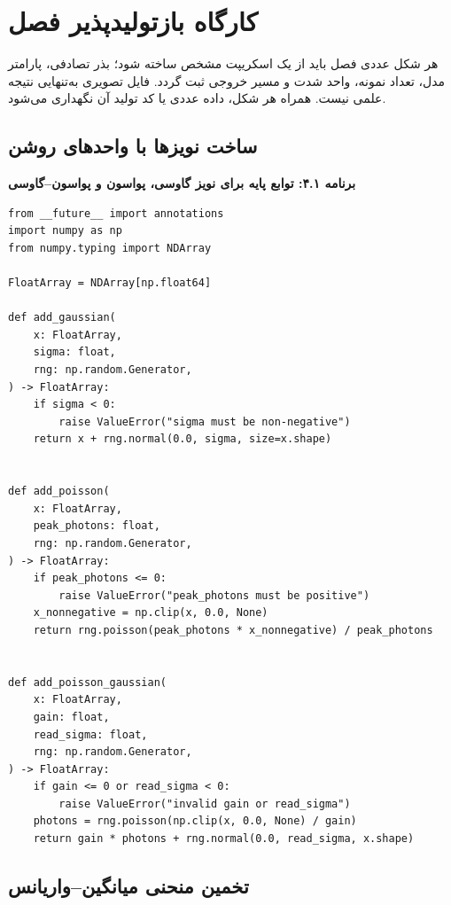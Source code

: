 \documentclass[12pt,openany,oneside]{book}
\begin{document}
\section{کارگاه بازتولیدپذیر فصل}

\begin{codecontract}
هر شکل عددی فصل باید از یک اسکریپت مشخص ساخته شود؛ بذر تصادفی، پارامتر مدل، تعداد نمونه، واحد شدت و مسیر خروجی
ثبت گردد. فایل تصویری به‌تنهایی نتیجه علمی نیست. همراه هر شکل، داده عددی یا کد تولید آن نگهداری می‌شود.
\end{codecontract}

\subsection{ساخت نویزها با واحدهای روشن}

\noindent\textbf{برنامه ۴.۱: توابع پایه برای نویز گاوسی، پواسون و پواسون--گاوسی}\par
\begin{latin}
\begin{lstlisting}
from __future__ import annotations
import numpy as np
from numpy.typing import NDArray

FloatArray = NDArray[np.float64]

def add_gaussian(
    x: FloatArray,
    sigma: float,
    rng: np.random.Generator,
) -> FloatArray:
    if sigma < 0:
        raise ValueError("sigma must be non-negative")
    return x + rng.normal(0.0, sigma, size=x.shape)


def add_poisson(
    x: FloatArray,
    peak_photons: float,
    rng: np.random.Generator,
) -> FloatArray:
    if peak_photons <= 0:
        raise ValueError("peak_photons must be positive")
    x_nonnegative = np.clip(x, 0.0, None)
    return rng.poisson(peak_photons * x_nonnegative) / peak_photons


def add_poisson_gaussian(
    x: FloatArray,
    gain: float,
    read_sigma: float,
    rng: np.random.Generator,
) -> FloatArray:
    if gain <= 0 or read_sigma < 0:
        raise ValueError("invalid gain or read_sigma")
    photons = rng.poisson(np.clip(x, 0.0, None) / gain)
    return gain * photons + rng.normal(0.0, read_sigma, x.shape)
\end{lstlisting}
\end{latin}

\subsection{تخمین منحنی میانگین--واریانس}
\end{document}
